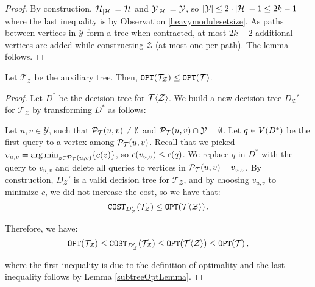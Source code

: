 \begin{lemma}
\begin{proof}
        By construction, $\mathcal{H}_{\mathopen{}\left| \mathcal{H} \right|}=\mathcal{H}$ and $\mathcal{Y}_{\mathopen{}\left| \mathcal{H} \right|}=\mathcal{Y}$, so $\mathopen{}\left| \mathcal{Y} \right| \leq 2\cdot \mathopen{}\left| \mathcal{H} \right| - 1 \leq 2k-1$ where the last inequality is by Observation \ref{heavymodulesetsize}. As paths between vertices in $\mathcal{Y}$ form a tree when contracted, at most $2k-2$ additional vertices are added while constructing $\mathcal{Z}$ (at most one per path). The lemma follows.
    \end{proof}
\end{lemma}


\begin{lemma}\label{auxTreeCostLemma}
    Let $\mathcal{T}_{\mathcal{Z}}$ be the auxiliary tree. Then, $\texttt{OPT}\mathopen{}\left( \mathcal{T}_{\mathcal{Z}} \right)\leq \texttt{OPT}\mathopen{}\left( \mathcal{T} \right)$.
    \begin{proof}
        Let $D^*$ be the decision tree for $\mathcal{T}\mathopen{}\langle \mathcal{Z} \rangle$. We build a new decision tree $D_{\mathcal{Z}}'$ for $\mathcal{T}_{\mathcal{Z}}$ by transforming $D^*$ as follows: 
        
        Let $u,v\in \mathcal{Y}$, such that $\mathcal{P}_{\mathcal{T}}\mathopen{}\left( u, v \right)\neq\emptyset$ and $\mathcal{P}_{\mathcal{T}}\mathopen{}\left( u, v \right)\cap \mathcal{Y}=\emptyset$. Let $q\in V\mathopen{}\left( D^* \right)$ be the first query to a vertex among $\mathcal{P}_{\mathcal{T}}\mathopen{}\left( u, v \right)$. Recall that we picked $v_{u,v}=\operatorname*{arg\,min}_{z\in \mathcal{P}_{\mathcal{T}}\mathopen{}\left( u, v \right)}\mathopen{}\left\{ c\mathopen{}\left( z \right) \right\}$, so $c\mathopen{}\left( v_{u,v} \right)\leq c\mathopen{}\left( q \right)$. 
        We replace $q$ in $D^*$ with the query to $v_{u,v}$ and delete all queries to vertices in $\mathcal{P}_{\mathcal{T}}\mathopen{}\left( u, v \right)-v_{u,v}$. By construction, $D_{\mathcal{Z}}'$ is a valid decision tree for $\mathcal{T}_{\mathcal{Z}}$, and by choosing $v_{u,v}$ to minimize $c$, we did not increase the cost, so we have that: 
        $$
        \texttt{COST}_{D_{\mathcal{Z}}'}\mathopen{}\left( \mathcal{T}_{\mathcal{Z}} \right) \leq \texttt{OPT}\mathopen{}\left( \mathcal{T}\mathopen{}\langle \mathcal{Z} \rangle \right).
        $$
        
        Therefore, we have:
        $$
        \texttt{OPT}\mathopen{}\left( \mathcal{T}_{\mathcal{Z}} \right)\leq \texttt{COST}_{D_{\mathcal{Z}}'}\mathopen{}\left( \mathcal{T}_{\mathcal{Z}} \right)\leq \texttt{OPT}\mathopen{}\left( \mathcal{T}\mathopen{}\langle \mathcal{Z} \rangle \right)\leq \texttt{OPT}\mathopen{}\left( \mathcal{T} \right),
        $$
        
        where the first inequality is due to the definition of optimality and the last inequality follows by Lemma \ref{subtreeOptLemma}.
    \end{proof}
\end{lemma}


